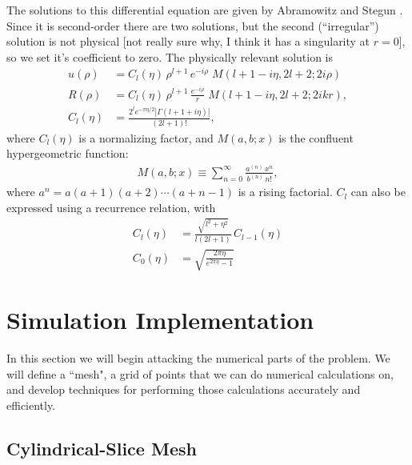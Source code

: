 \documentclass[12pt]{article}
\numberwithin{equation}{section}
\begin{document}
The solutions to this differential equation are given by Abramowitz and Stegun \cite{Abramowitz1965, NIST:DLMF}. Since it is second-order there are two solutions, but the second (``irregular'') solution is not physical [not really sure why, I think it has a singularity at $r=0$], so we set it's coefficient to zero. The physically relevant solution is
\begin{align*}
u(\rho) &= C_l(\eta) \, \rho^{l+1} \, e^{-i\rho} \; M(l+1-i\eta, 2l+2; 2i\rho) \\
R(\rho) &= C_l(\eta) \, \rho^{l+1} \, \frac{e^{-i\rho}}{r} \; M(l+1-i\eta, 2l+2; 2ikr), \\
C_l(\eta) &= \frac{2^l e^{-\pi \eta / 2} \left|\Gamma\left(l + 1 + i\eta\right)\right|}{\left(2l+1\right)!},
\end{align*}
where $C_l(\eta)$ is a normalizing factor, and $M(a, b; x)$ is the confluent hypergeometric function:
\begin{align*}
M(a, b; x) \equiv \sum_{n=0}^{\infty} \frac{a^{(n)} \, x^n}{b^{(n)} \, n!},
\end{align*}
where $a^{n} = a (a+1) (a+2) \cdots (a+n-1)$ is a rising factorial. $C_l$ can also be expressed using a recurrence relation, with
\begin{align*}
C_l(\eta) &= \frac{\sqrt{l^2 + \eta^2}}{l \left(2l + 1\right)} \, C_{l-1}(\eta) \\
C_0(\eta) &= \sqrt{\frac{2 \pi \eta}{e^{2 \pi \eta} - 1}}
\end{align*}


\newpage
\section{Simulation Implementation}\label{sec:cylindrical_slices}

In this section we will begin attacking the numerical parts of the problem. We will define a ``mesh", a grid of points that we can do numerical calculations on, and develop techniques for performing those calculations accurately and efficiently.

\subsection{Cylindrical-Slice Mesh}\label{sec:cylindrical_slices}
\end{document}

